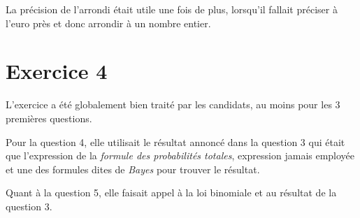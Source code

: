\documentclass[a4paper,12Pt,french]{article}
\begin{document}
La précision de l'arrondi était utile une fois de plus, lorsqu'il
fallait préciser à l'euro près et donc arrondir à un nombre entier.

\section{Exercice 4}

L'exercice a été globalement bien traité par les candidats, au moins
pour les 3 premières questions.

Pour la question 4, elle utilisait le résultat annoncé dans la question
3 qui était que l'expression de la \emph{formule des probabilités
totales}, expression jamais employée et une des formules dites de
\emph{Bayes} pour trouver le résultat.

Quant à la question 5, elle faisait appel à la loi binomiale et au
résultat de la question 3.
\end{document}

